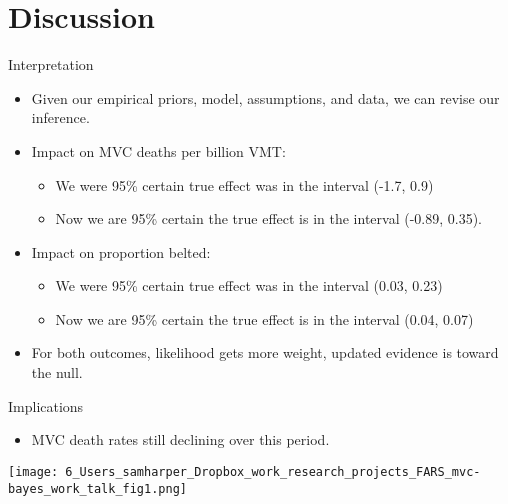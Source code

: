 \documentclass[english]{beamer}\usepackage[]{graphicx}\usepackage[]{color}
\begin{document}
\section{Discussion}
\begin{frame}{Interpretation}
\begin{itemize}
\item Given our empirical priors, model, assumptions, and data, we can revise
our inference.\medskip{}
\item Impact on MVC deaths per billion VMT:
\begin{itemize}
\item We were 95\% certain true effect was in the interval (-1.7, 0.9)
\item Now we are 95\% certain the true effect is in the interval (-0.89,
0.35).
\end{itemize}
\medskip{}

\item<2-> Impact on proportion belted:
\begin{itemize}
\item We were 95\% certain true effect was in the interval (0.03, 0.23)
\item Now we are 95\% certain the true effect is in the interval (0.04,
0.07)
\end{itemize}
\medskip{}

\item<3-> For both outcomes, likelihood gets more weight, updated evidence
is toward the null. 
\end{itemize}
\end{frame}
%
\begin{frame}{Implications}
\begin{itemize}
\item MVC death rates still declining over this period.
\end{itemize}
\begin{center}
\texttt{[image: 6\_Users\_samharper\_Dropbox\_work\_research\_projects\_FARS\_mvc-bayes\_work\_talk\_fig1.png]}
\par\end{center}

\end{frame}
%
\end{document}
